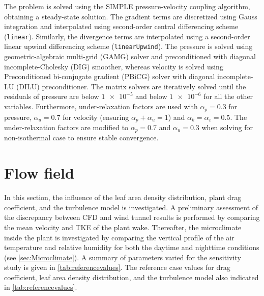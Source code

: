 The problem is solved using the SIMPLE pressure-velocity coupling algorithm, obtaining a steady-state solution. The gradient terms are discretized using Gauss integration and interpolated using second-order central differencing scheme (\texttt{linear}). Similarly, the divergence terms are interpolated using a second-order linear upwind differencing scheme (\texttt{linearUpwind}). The pressure is solved using geometric-algebraic multi-grid (GAMG) solver and preconditioned with diagonal incomplete-Cholesky (DIG) smoother, whereas velocity is solved using Preconditioned bi-conjugate gradient (PBiCG) solver with diagonal incomplete-LU (DILU) preconditioner. The matrix solvers are iteratively solved until the residuals of pressure are below $\num{1e-5}$ and below $\num{1e-6}$ for all the other variables. Furthermore, under-relaxation factors are used with $\alpha_p = 0.3$ for pressure, $\alpha_u = 0.7$ for velocity (ensuring $\alpha_p + \alpha_u = 1$) and $\alpha_k = \alpha_{\varepsilon}=0.5$. The under-relaxation factors are modified to $\alpha_p=0.7$ and $\alpha_u=0.3$ when solving for non-isothermal case to ensure stable convergence.

\section{Flow field}
\label{sec:flowfield}
In this section, the influence of the leaf area density distribution, plant drag coefficient, and the turbulence model is investigated. A preliminary assessment of the discrepancy between CFD and wind tunnel results is performed by comparing the mean velocity and TKE of the plant wake. Thereafter, the microclimate inside the plant is investigated by comparing the vertical profile of the air temperature and relative humidity for both the daytime and nighttime conditions (see \cref{sec:Microclimate}). A summary of parameters varied for the sensitivity study is given in \cref{tab:referencevalues}. The reference case values for drag coefficient, leaf area density distribution, and the turbulence model also indicated in \cref{tab:referencevalues}.



